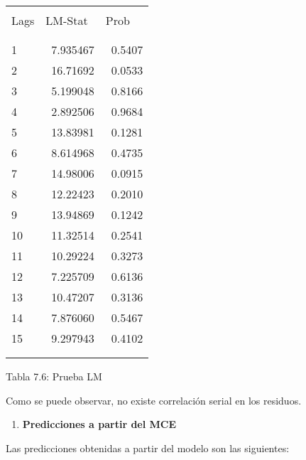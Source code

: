 \begin{table}[H]
\begin{center}
\begin{tabular}{|p{43pt}|l|l|}
\hline
& 
& 
 \\
\hline
& 
& 
 \\
\hline
Lags& 
LM-Stat& 
Prob \\
\hline
& 
& 
 \\
\hline
& 
& 
 \\
\hline
1& 
~7.935467& 
~0.5407 \\
\hline
2& 
~16.71692& 
~0.0533 \\
\hline
3& 
~5.199048& 
~0.8166 \\
\hline
4& 
~2.892506& 
~0.9684 \\
\hline
5& 
~13.83981& 
~0.1281 \\
\hline
6& 
~8.614968& 
~0.4735 \\
\hline
7& 
~14.98006& 
~0.0915 \\
\hline
8& 
~12.22423& 
~0.2010 \\
\hline
9& 
~13.94869& 
~0.1242 \\
\hline
10& 
~11.32514& 
~0.2541 \\
\hline
11& 
~10.29224& 
~0.3273 \\
\hline
12& 
~7.225709& 
~0.6136 \\
\hline
13& 
~10.47207& 
~0.3136 \\
\hline
14& 
~7.876060& 
~0.5467 \\
\hline
15& 
~9.297943& 
~0.4102 \\
\hline
& 
& 
 \\
\hline
& 
& 
 \\
\hline
\end{tabular}
\label{tab14}
\end{center}
\end{table}

\begin{center}
Tabla 7.6: Prueba LM \newline

\end{center}

Como se puede observar, no existe correlaci\'{o}n serial en los residuos.

\begin{enumerate}
\item \textbf{Predicciones a partir del MCE}
\end{enumerate}
Las predicciones obtenidas a partir del modelo son las siguientes:

